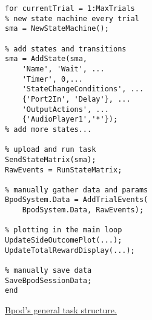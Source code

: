 \begin{marginfigure}[0.35cm]
\begin{verbatim}
for currentTrial = 1:MaxTrials
% new state machine every trial
sma = NewStateMachine();

% add states and transitions
sma = AddState(sma, 
    'Name', 'Wait', ...
    'Timer', 0,...
    'StateChangeConditions', ...
    {'Port2In', 'Delay'}, ...
    'OutputActions', ...
    {'AudioPlayer1','*'});
% add more states...

% upload and run task
SendStateMatrix(sma);
RawEvents = RunStateMatrix;

% manually gather data and params
BpodSystem.Data = AddTrialEvents(
    BpodSystem.Data, RawEvents);
    
% plotting in the main loop
UpdateSideOutcomePlot(...);
UpdateTotalRewardDisplay(...);

% manually save data
SaveBpodSessionData;
end
\end{verbatim}
\caption{\href{https://github.com/sanworks/Bpod_Gen2/blob/df6cd0c7d5df8247b02077b05fc263f79b86b096/Examples/Protocols/Sound/AnalogSound2AFC/AnalogSound2AFC.m}{Bpod's general task structure.}}
\label{fig:bpodtask}
\end{marginfigure}\nobreak
